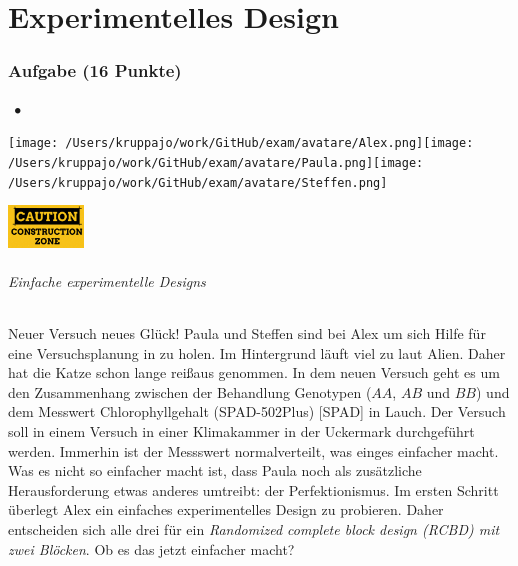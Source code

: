 \documentclass[a4paper, 9pt]{scrartcl}\usepackage[]{graphicx}\usepackage[]{xcolor}
\begin{document}
\part{Experimentelles Design}

\section{Aufgabe \hfill (16 Punkte)}


 
\ifcollection
\begin{flushright}
\tiny\vspace{-3Ex}
\textbf{\examinhaltstart}
\exammodulestatversuch $\;\bullet$
\exammodulebiostat
\vspace{-4Ex}
\end{flushright}
\begin{minipage}[t]{0.5\textwidth}
\texttt{[image: /Users/kruppajo/work/GitHub/exam/avatare/Alex.png]}\hspace{-4mm}\texttt{[image: /Users/kruppajo/work/GitHub/exam/avatare/Paula.png]}\hspace{-4mm}\texttt{[image: /Users/kruppajo/work/GitHub/exam/avatare/Steffen.png]}
\end{minipage}
\begin{minipage}[t]{0.5\textwidth}
\hfill
\href{https://youtu.be/wJqsNV1hOW8}{\includegraphics[width = 2cm]{img/caution}}
\end{minipage}
\fi



\ifcollection
\paragraph{Einfache experimentelle Designs}
\fi

Neuer Versuch neues Glück! Paula und Steffen sind bei Alex um sich Hilfe für eine Versuchsplanung in \Rlogo zu holen. Im Hintergrund läuft viel zu laut Alien. Daher hat die Katze schon lange reißaus genommen. In dem neuen Versuch geht es um den Zusammenhang zwischen der Behandlung Genotypen ($AA$, $AB$ und $BB$) und dem Messwert Chlorophyllgehalt (SPAD-502Plus) [SPAD] in Lauch. Der Versuch soll in einem Versuch in einer Klimakammer in der Uckermark durchgeführt werden. Immerhin ist der Messswert normalverteilt, was einges einfacher macht. Was es nicht so einfacher macht ist, dass Paula noch als zusätzliche Herausforderung etwas anderes umtreibt: der Perfektionismus. Im ersten Schritt überlegt Alex ein einfaches experimentelles Design zu probieren. Daher entscheiden sich alle drei für ein \textit{Randomized complete block design (RCBD) mit zwei Blöcken}. Ob es das jetzt einfacher macht?\\
\end{document}

